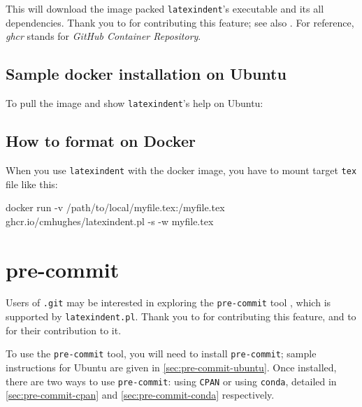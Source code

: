  This will download the image packed \texttt{latexindent}'s executable and its all
  dependencies.  Thank you to \cite{eggplants} for contributing this
  feature; see also \cite{cmhughesio}. For reference, \emph{ghcr} stands for \emph{GitHub
  Container Repository}.

 \subsection{Sample docker installation on Ubuntu}
  To pull the image and show \texttt{latexindent}'s help on Ubuntu:


 \subsection{How to format on Docker}
  When you use \texttt{latexindent} with the docker image, you have to mount target \texttt{tex} file like this:

  \begin{commandshell}
docker run -v /path/to/local/myfile.tex:/myfile.tex ghcr.io/cmhughes/latexindent.pl -s -w myfile.tex
\end{commandshell}

 \section{pre-commit}

  Users of \texttt{.git} may be interested  in exploring the \texttt{pre-commit} tool \cite{pre-commithome}, which
  is supported by \texttt{latexindent.pl}. Thank you to \cite{tdegeusprecommit} for
  contributing this feature, and to \cite{holzhausprecommit} for their contribution to
  it.

  To use the \texttt{pre-commit} tool, you will need to install \texttt{pre-commit};
  sample instructions for Ubuntu are given in \cref{sec:pre-commit-ubuntu}. Once
  installed, there are two ways to use \texttt{pre-commit}: using \texttt{CPAN} or using
  \texttt{conda}, detailed in \cref{sec:pre-commit-cpan} and \cref{sec:pre-commit-conda}
  respectively.

